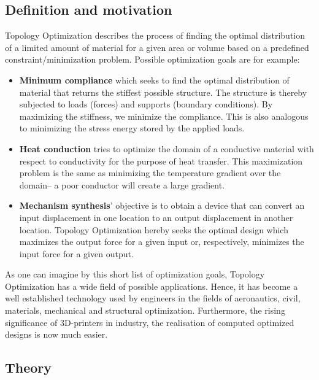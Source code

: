 \subsection{Definition and motivation}
Topology Optimization describes the process of finding the optimal distribution of a limited amount of material for a given area or volume based on a predefined constraint/minimization problem. Possible optimization goals are for example:
\begin{itemize}
\item \textbf{Minimum compliance} which seeks to find the optimal distribution of material that returns the stiffest possible structure. The structure is thereby subjected to loads (forces) and supports (boundary conditions). By maximizing the stiffness, we minimize the compliance. This is also analogous to minimizing the stress energy stored by the applied loads.
\item \textbf{Heat conduction} tries to optimize the domain of a conductive material with respect to conductivity for the purpose of heat transfer. This maximization problem is the same as minimizing the temperature gradient over the domain-- a poor conductor will create a large gradient.
\item \textbf{Mechanism synthesis}' objective is to obtain a device that can convert an input displacement in one location to an output displacement in another location. Topology Optimization hereby seeks the optimal design which maximizes the output force for a given input or, respectively, minimizes the input force for a given output.
\end{itemize}


As one can imagine by this short list of optimization goals, Topology Optimization has a wide field of possible applications. Hence, it has become a well established technology used by engineers in the fields of aeronautics, civil, materials, mechanical and structural optimization. Furthermore, the rising significance of 3D-printers in industry, the realisation of computed optimized designs is now much easier.

\subsection{Theory}
